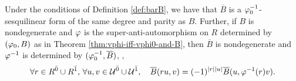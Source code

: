 \begin{prop}\label{prop:barB-determines-vphi-inv}
    Under the conditions of Definition \ref{def:barB}, we have that $\overline {B}$ is a $\varphi_0^{-1}$-sesquilinear form of the same degree and parity as $B$. 
    Further, if $B$ is nondegenerate and $\varphi$ is the super-anti-automorphism on $R$ determined by $(\varphi_0, B)$ as in Theorem \ref{thm:vphi-iff-vphi0-and-B}, then $\overline{B}$ is nondegenerate and $\varphi^{-1}$ is determined by $(\varphi_0^{-1}, \overline B)$, \ie, 
    \begin{equation}\label{eq:barB-superadjunction}
        \forall r\in R^{\bar0} \cup R^{\bar1} ,\,\forall u, v \in \mathcal U^{\bar0} \cup \mathcal U^{\bar1},  \quad \overline {B}(ru,v) = (-1)^{|r||u|} \overline {B}(u,\varphi^{-1} (r)v).
    \end{equation}
\end{prop}

